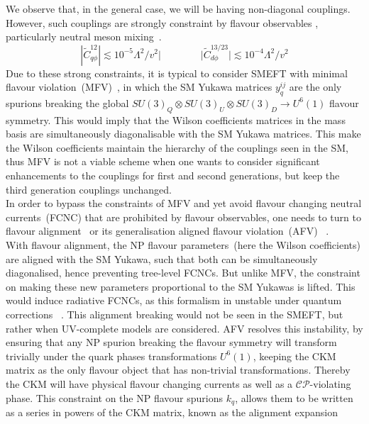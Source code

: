 We observe that, in the general case, we will be having non-diagonal couplings. However, such couplings are strongly constraint by flavour observables , particularly neutral meson mixing~\cite{Blankenburg:2012ex}.
\begin{equation}
|\tilde{C}_{q\phi}^{12}| \lesssim 10^{-5} \Lambda^2/v^2| \quad \quad  \quad \quad | \tilde{C}_{d\phi}^{13/23}| \lesssim 10^{-4} \Lambda^2/v^2
	\end{equation}
 Due to these strong constraints, it is typical to consider SMEFT with minimal flavour violation~(MFV)~\cite{DAmbrosio:2002vsn}, in which the SM Yukawa matrices $y_q^{ij}$ are the only spurions breaking the global $SU(3)_Q \otimes SU(3)_U \otimes SU(3)_D \to U^6(1)$ flavour symmetry. This would imply that the Wilson coefficients matrices in the mass basis are simultaneously diagonalisable with the SM Yukawa matrices. This make the Wilson coefficients  maintain the hierarchy of the couplings seen in the SM, thus MFV is not a viable scheme when one wants to consider significant enhancements to the couplings for first and second generations, but keep the third generation couplings unchanged. \\ In order to bypass the constraints of MFV and yet avoid flavour changing neutral currents~(FCNC) that are prohibited by flavour observables, one needs to turn to  flavour alignment~\cite{Pich:2009sp,Pich:2010ic} or its generalisation aligned flavour violation~(AFV)~\cite{Egana-Ugrinovic:2018znw} . \\ 
 With flavour alignment, the NP flavour parameters~(here the Wilson coefficients) are aligned with the SM Yukawa, such that both can be simultaneously diagonalised, hence preventing tree-level FCNCs. But unlike MFV, the constraint on making these new parameters proportional to the SM Yukawas is lifted.  This would induce radiative FCNCs, as this formalism in unstable under quantum corrections ~\cite{Ferreira:2010xe,Jung:2010ik,Botella:2015yfa}. This alignment breaking would not be seen in the SMEFT, but rather when UV-complete models are considered. AFV resolves this instability, by ensuring that any NP spurion breaking the flavour symmetry will transform trivially under the quark phases transformations $ U^6(1)$, keeping the CKM matrix as the only flavour object that has non-trivial transformations. Thereby the CKM will have physical flavour changing currents as well as a $\mathcal{CP}$-violating phase. This constraint on the NP flavour spurions $k_q$, allows them to be written as a series in powers of the CKM matrix, known as the alignment expansion
